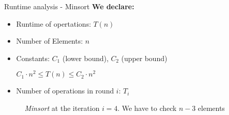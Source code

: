 


\begin{frame}{Runtime analysis - Minsort}
  \textbf{We declare:}
  \begin{itemize}
    \item Runtime of opertations: $T(n)$
    \item Number of Elements: $n$
    \item Constants: $C_1$ ({\color{MainBLight}lower bound}),
      $C_2$ ({\color{MainBLight}upper bound})
    \begin{center}
      $C_{1} \cdot n^2
      \leq T(n)
      \leq C_{2} \cdot n^2$
    \end{center}
    \item Number of operations in round $i$: $T_i$
  \end{itemize}
  \begin{figure}[!h]
    \begin{adjustbox}{width=0.5\linewidth}
    \end{adjustbox}%
    \caption{\textit{Minsort} at the iteration $i = 4$.
      We have to check $n - 3$ elements}%
    \label{fig:minsort_def}%
  \end{figure}
\end{frame}


